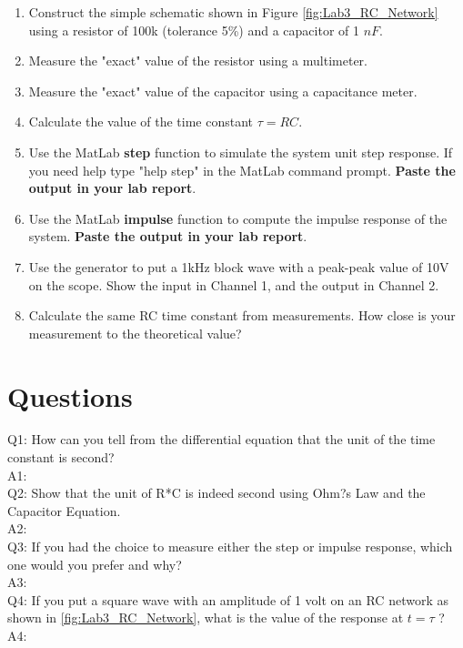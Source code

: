 \documentclass[11pt,letterpaper]{article}
\begin{document}
\begin{enumerate}
\item Construct the simple schematic shown in Figure \ref{fig:Lab3_RC_Network} using a resistor of 100k (tolerance 5\%) and a capacitor of 1 $nF$.
\item Measure the "exact" value of the resistor using a multimeter. 
\item Measure the "exact" value of the capacitor using a capacitance meter.
\item Calculate the value of the time constant $\tau = RC$.
\item Use the MatLab \textbf{step} function to simulate the system unit step response. If you need help type "help step" in the MatLab command prompt. \textbf{Paste the output in your lab report}.
\item Use the MatLab \textbf{impulse} function to compute the impulse response of the system. \textbf{Paste the output in your lab report}.
\item Use the generator to put a 1kHz block wave with a peak-peak value of 10V on the scope. Show the input in Channel 1, and the output in Channel 2.
\item Calculate the same RC time constant from measurements. How close is your measurement to the theoretical value?
\end{enumerate}

\section{Questions}

Q1: How can you tell from the differential equation that the unit of the time constant is second?\\
A1:\\

Q2: Show that the unit of R*C is indeed second using Ohm?s Law and the Capacitor Equation.\\
A2:\\

Q3: If you had the choice to measure either the step or impulse response, which one would you prefer and why?\\
A3:\\

Q4: If you put a square wave with an amplitude of 1 volt on an RC network as shown in \ref{fig:Lab3_RC_Network}, what is the value of the response at $t = \tau$ ?\\
A4:\\
\end{document}
